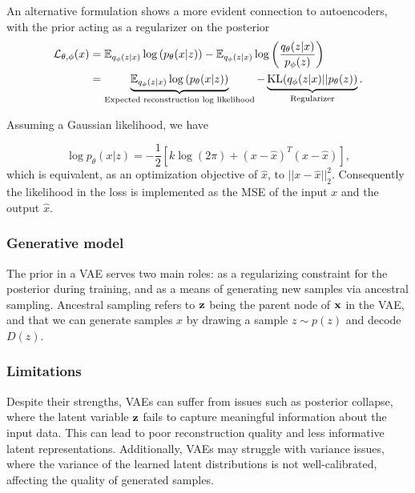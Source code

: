 \documentclass[../../thesis.tex]{subfiles}
\begin{document}
An alternative formulation shows a more evident connection to autoencoders, with the prior acting as a regularizer on the posterior
\begin{equation}
    \begin{aligned}
        \label{eq:ELBO_AE}
        \mathcal{L}_{\theta,\phi}(x) 
        &=  \mathbb{E}_{q_\phi(z|x)} \log \left( p_\theta(x|z)\right) - \mathbb{E}_{q_\phi(z|x)} \log \left( \frac{q_\theta(z|x)}{p_\phi(z)}\right) \\
        &= \underbrace{\mathbb{E}_{q_\phi(z|x)} \log \left( p_\theta(x|z)\right)}_{\text{Expected reconstruction log likelihood}} - \underbrace{\textrm{KL}(q_\phi(z|x)|| p_\theta(z))}_{\text{Regularizer}}.
    \end{aligned}
\end{equation}

Assuming a Gaussian likelihood, we have

\begin{equation}
    \log p_\theta(x|z) = -\frac12 \left[k\log(2\pi)+ (x-\widehat{x})^T(x-\widehat{x})\right],
\end{equation}
which is equivalent, as an optimization objective of $\widehat{x}$, to $||x-\widehat{x}||_2^2$. Consequently the likelihood in the loss is implemented as the MSE of the input $x$ and the output $\widehat{x}$.

\subsubsection{Generative model}
The prior in a VAE serves two main roles: as a regularizing constraint for the posterior during training, and as a means of generating new samples via ancestral sampling. Ancestral sampling refers to $\mathbf{z}$ being the parent node of $\mathbf{x}$ in the VAE, and that we can generate samples $x$ by drawing a sample $z\sim p(z)$ and decode $D(z)$. 


\subsubsection{Limitations}

Despite their strengths, VAEs can suffer from issues such as posterior collapse, where the latent variable $\mathbf{z}$ fails to capture meaningful information about the input data. This can lead to poor reconstruction quality and less informative latent representations. Additionally, VAEs may struggle with variance issues, where the variance of the learned latent distributions is not well-calibrated, affecting the quality of generated samples.\newline
\end{document}
